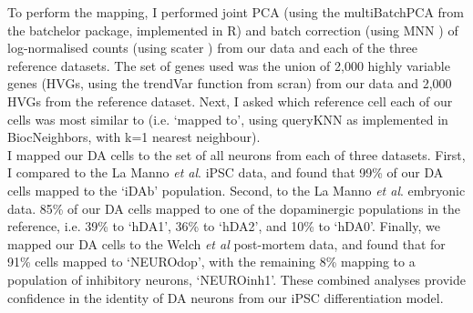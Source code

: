 To perform the mapping, I performed joint PCA (using the multiBatchPCA from the batchelor package, implemented in R) 
and batch correction (using MNN \cite{haghverdi2018batch}) of log-normalised counts (using scater \cite{mccarthy2017scater}) from our data and each of the three reference datasets. 
The set of genes used was the union of 2,000 highly variable genes (HVGs, using the trendVar function from scran) 
from our data and 2,000 HVGs from the reference dataset. 
Next, I asked which reference cell each of our cells was most similar to (i.e. ‘mapped to', using queryKNN as implemented in BiocNeighbors, with k=1 nearest neighbour).\\

I mapped our DA cells to the set of all neurons from each of three datasets.
First, I compared to the La Manno \textit{et al}. iPSC data, and found that
99\% of our DA cells mapped to the `iDAb' population.
Second, to the La Manno \textit{et al}. embryonic data. 
85\% of our DA cells mapped to one of the dopaminergic populations in the reference, i.e. 39\% to `hDA1', 36\% to `hDA2', and 10\% to `hDA0'.
Finally, we mapped our DA cells to the Welch \textit{et al} post-mortem data, and found that for 91\% cells mapped to `NEUROdop', with the remaining 8\% mapping to a population of inhibitory neurons, `NEUROinh1'.
These combined analyses provide confidence in the identity of DA neurons from our iPSC differentiation model.







